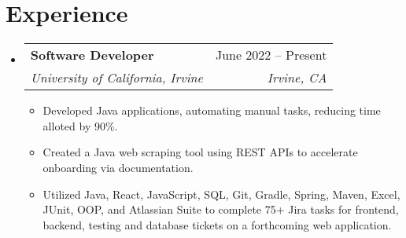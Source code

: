 \documentclass[letterpaper,11pt]{article}
\makeatletter
\newcommand{\resumeItem}[1]{
  \item\small{
    {#1 \vspace{-2pt}}
  }
}
\newcommand{\resumeSubheading}[4]{
  \vspace{-2pt}\item
    \begin{tabular*}{0.97\textwidth}[t]{l@{\extracolsep{\fill}}r}
      \textbf{#1} & #2 \\
      \textit{\small#3} & \textit{\small #4} \\
    \end{tabular*}\vspace{-7pt}
}
\newcommand{\resumeSubSubheading}[2]{
    \item
    \begin{tabular*}{0.97\textwidth}{l@{\extracolsep{\fill}}r}
      \textit{\small#1} & \textit{\small #2} \\
    \end{tabular*}\vspace{-7pt}
}
\newcommand{\resumeSubHeadingListStart}{\begin{itemize}[leftmargin=0.15in, label={}]}
\newcommand{\resumeSubHeadingListEnd}{\end{itemize}}
\newcommand{\resumeItemListStart}{\begin{itemize}}
\newcommand{\resumeItemListEnd}{\end{itemize}\vspace{-5pt}}
\makeatother
\begin{document}
\section{Experience}
  \resumeSubHeadingListStart

    \resumeSubheading
      {Software Developer}{June 2022 -- Present}
      {University of California, Irvine}{Irvine, CA}
      \resumeItemListStart
        \resumeItem{Developed Java applications, automating manual tasks, reducing time alloted by 90\%.}
        \resumeItem{Created a Java web scraping tool using REST APIs to accelerate onboarding via documentation.
        }
        \resumeItem{Utilized Java, React, JavaScript, SQL, Git, Gradle, Spring, Maven, Excel, JUnit, OOP, and Atlassian Suite to complete 75+ Jira tasks for frontend, backend, testing and database tickets on a forthcoming web application. 
        }
      \resumeItemListEnd
      

  \resumeSubHeadingListEnd


\end{document}
